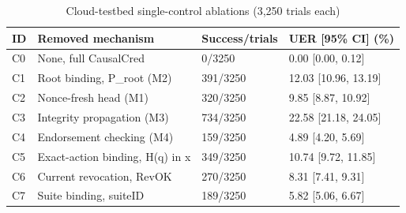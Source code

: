 \begin{table}[t]
\centering
\caption{Cloud-testbed single-control ablations (3,250 trials each)}
\begin{tabular}{llll}
\hline
ID & Removed mechanism & Success/trials & UER [95\% CI] (\%) \\
\hline
C0 & None, full CausalCred & 0/3250 & 0.00 [0.00, 0.12] \\
C1 & Root binding, P\_root (M2) & 391/3250 & 12.03 [10.96, 13.19] \\
C2 & Nonce-fresh head (M1) & 320/3250 & 9.85 [8.87, 10.92] \\
C3 & Integrity propagation (M3) & 734/3250 & 22.58 [21.18, 24.05] \\
C4 & Endorsement checking (M4) & 159/3250 & 4.89 [4.20, 5.69] \\
C5 & Exact-action binding, H(q) in x & 349/3250 & 10.74 [9.72, 11.85] \\
C6 & Current revocation, RevOK & 270/3250 & 8.31 [7.41, 9.31] \\
C7 & Suite binding, suiteID & 189/3250 & 5.82 [5.06, 6.67] \\
\hline
\end{tabular}
\end{table}
